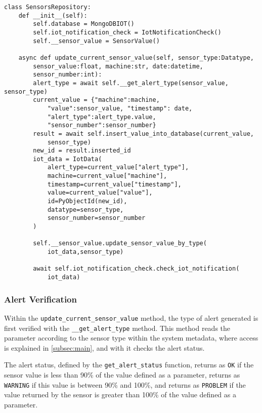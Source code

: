\begin{Verbatim}[fontsize=\small, baselinestretch=0.8]
class SensorsRepository:
    def __init__(self):
        self.database = MongoDBIOT()
        self.iot_notification_check = IotNotificationCheck()
        self.__sensor_value = SensorValue()

    async def update_current_sensor_value(self, sensor_type:Datatype,
        sensor_value:float, machine:str, date:datetime, 
        sensor_number:int):
        alert_type = await self.__get_alert_type(sensor_value, sensor_type)
        current_value = {"machine":machine,
            "value":sensor_value, "timestamp": date,
            "alert_type":alert_type.value,
            "sensor_number":sensor_number}
        result = await self.insert_value_into_database(current_value, 
            sensor_type)
        new_id = result.inserted_id
        iot_data = IotData(
            alert_type=current_value["alert_type"],
            machine=current_value["machine"],
            timestamp=current_value["timestamp"],
            value=current_value["value"],
            id=PyObjectId(new_id),
            datatype=sensor_type,
            sensor_number=sensor_number
        )
        
        self.__sensor_value.update_sensor_value_by_type(
            iot_data,sensor_type)
        
        await self.iot_notification_check.check_iot_notification(
            iot_data)
\end{Verbatim}

\subsubsection{Alert Verification}

Within the \texttt{update\_current\_sensor\_value} method, the type of alert generated is first verified with the \texttt{\_\_get\_alert\_type} method. This method reads the parameter according to the sensor type within the system metadata, where access is explained in \ref{subsec:main}, and with it checks the alert status.

The alert status, defined by the \texttt{get\_alert\_status} function, returns as \texttt{OK} if the sensor value is less than 90\% of the value defined as a parameter, returns as \texttt{WARNING} if this value is between 90\% and 100\%, and returns as \texttt{PROBLEM} if the value returned by the sensor is greater than 100\% of the value defined as a parameter.


